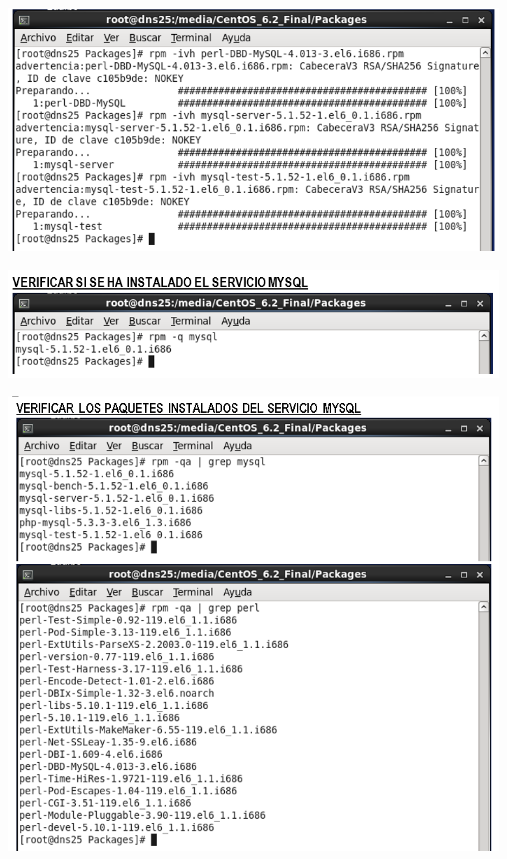 \begin{itemize}
	\begin{center}
		\includegraphics[width=13cm]{./Imagenes/6a}
		\end{center}
\end{itemize} 

\begin{itemize}
	\begin{center}
		\includegraphics[width=13cm]{./Imagenes/7a}
		\end{center}
\end{itemize} 

\begin{itemize}
	\begin{center}
		\includegraphics[width=13cm]{./Imagenes/8a}
		\end{center}
\end{itemize} 

